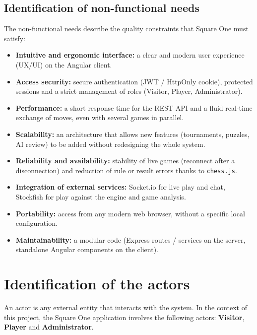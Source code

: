 \documentclass[12pt,a4paper,oneside]{report}
\begin{document}
\subsection{Identification of non-functional needs}
The non-functional needs describe the quality constraints that Square One must satisfy:
\begin{itemize}[leftmargin=1.4em,itemsep=0.4em]
  \item \textbf{Intuitive and ergonomic interface:} a clear and modern user experience (UX/UI) on the Angular client.
  \item \textbf{Access security:} secure authentication (JWT / HttpOnly cookie), protected sessions and a strict management of roles (Visitor, Player, Administrator).
  \item \textbf{Performance:} a short response time for the REST API and a fluid real-time exchange of moves, even with several games in parallel.
  \item \textbf{Scalability:} an architecture that allows new features (tournaments, puzzles, AI review) to be added without redesigning the whole system.
  \item \textbf{Reliability and availability:} stability of live games (reconnect after a disconnection) and reduction of rule or result errors thanks to \texttt{chess.js}.
  \item \textbf{Integration of external services:} Socket.io for live play and chat, Stockfish for play against the engine and game analysis.
  \item \textbf{Portability:} access from any modern web browser, without a specific local configuration.
  \item \textbf{Maintainability:} a modular code (Express routes / services on the server, standalone Angular components on the client).
\end{itemize}

\section{Identification of the actors}
An actor is any external entity that interacts with the system. In the context of this project, the Square One application involves the following actors: \textbf{Visitor}, \textbf{Player} and \textbf{Administrator}.
\end{document}
